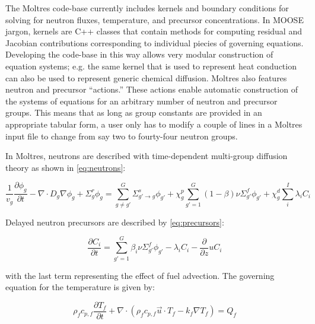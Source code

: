 \documentclass{article}
\begin{document}
The Moltres code-base currently includes kernels and boundary conditions for
solving for neutron fluxes, temperature, and precursor concentrations. In \gls{MOOSE}
jargon, kernels are C++ classes that contain methods for computing residual and
Jacobian contributions corresponding to individual piecies of governing
equations. Developing the code-base in this way allows very modular construction
of equation systems; e.g. the same kernel that is used to represent heat
conduction can also be used to represent generic chemical diffusion. Moltres
also features neutron and precursor ``actions.'' These actions enable automatic
construction of the systems of equations for an arbitrary number of neutron and
precursor groups. This means that as long as group constants are provided in an appropriate
tabular form, a user only has to modify a couple of lines in a Moltres input
file to change from say two to fourty-four neutron groups.

In Moltres, neutrons are described with time-dependent multi-group diffusion theory as shown
in \cref{eq:neutrons}:

\begin{equation}
\frac{1}{v_g}\frac{\partial \phi_g}{\partial t} - \nabla \cdot D_g \nabla \phi_g
+ \Sigma_g^r \phi_g = \sum_{g \ne g'}^G \Sigma_{g'\rightarrow g}^s \phi_{g'} + \chi_g^p \sum_{g' = 1}^G (1 - \beta)
\nu \Sigma_{g'}^f \phi_{g'} + \chi_g^d \sum_i^I \lambda_i C_i
\label{eq:neutrons}
\end{equation}

Delayed neutron precursors are described by \cref{eq:precursors}:

\begin{equation}
\frac{\partial C_i}{\partial t} = \sum_{g'= 1}^G \beta_i \nu \Sigma_{g'}^f
\phi_{g'} - \lambda_i C_i - \frac{\partial}{\partial z} u C_i
\label{eq:precursors}
\end{equation}

with the last term representing the effect of fuel advection. The governing
equation for the temperature is given by:

\begin{equation}
  \rho_fc_{p,f}\frac{\partial T_f}{\partial t} + \nabla\cdot\left(\rho_f c_{p,f}
  \vec{u}\cdot T_f -k_f\nabla T_f\right) =  Q_f
  \label{eq:fuel_temp}
\end{equation}
\end{document}
